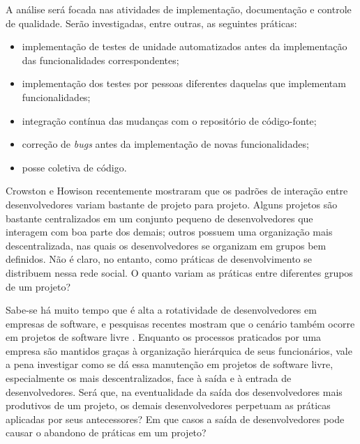 \documentclass{article}
\begin{document}
A análise será focada nas atividades de implementação, documentação e controle
de qualidade. Serão investigadas, entre outras, as seguintes práticas:

\begin{itemize}
  \item implementação de testes de unidade automatizados antes da implementação
  das funcionalidades correspondentes;
  \item implementação dos testes por pessoas diferentes daquelas que
  implementam funcionalidades;
  \item integração contínua das mudanças com o repositório de código-fonte;
  \item correção de \emph{bugs} antes da implementação de novas funcionalidades;
  \item posse coletiva de código.
\end{itemize}

Crowston e Howison \cite{crowston2005} recentemente mostraram que os padrões de
interação entre desenvolvedores variam bastante de projeto para projeto. Alguns
projetos são bastante centralizados em um conjunto pequeno de desenvolvedores
que interagem com boa parte dos demais; outros possuem uma organização mais
descentralizada, nas quais os desenvolvedores se organizam em grupos bem
definidos. Não é claro, no entanto, como práticas de desenvolvimento se
distribuem nessa rede social. O quanto variam as práticas entre diferentes
grupos de um projeto? 

Sabe-se há muito tempo que é alta a rotatividade de desenvolvedores em empresas
de software, e pesquisas recentes mostram que o cenário também ocorre em
projetos de software livre \cite{robles2006}. Enquanto os processos praticados
por uma empresa são mantidos graças à organização hierárquica de seus
funcionários, vale a pena investigar como se dá essa manutenção em projetos de
software livre, especialmente os mais descentralizados, face à saída e à entrada
de desenvolvedores. Será que, na eventualidade da saída dos desenvolvedores mais
produtivos de um projeto, os demais desenvolvedores perpetuam as práticas
aplicadas por seus antecessores? Em que casos a saída de desenvolvedores pode
causar o abandono de práticas em um projeto?
\end{document}
